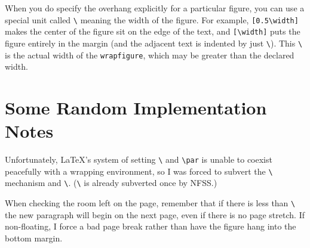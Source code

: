\documentclass[pagesize=auto]{scrartcl}
\makeatletter
\newcommand*{\cs}[1]{\texttt{\textbackslash#1}}
\newcommand*{\cmd}[1]{\cs{\expandafter\@gobble\string#1}}
\newcommand*{\env}[1]{\texttt{#1}}
\makeatother
\begin{document}
When you do specify the overhang explicitly for a particular figure, you
can use a special unit called \cmd{\width} meaning the width of the figure.
For example, \verb+[0.5\width]+ makes the center of the figure sit on the
edge of the text, and \verb+[\width]+ puts the figure entirely in the margin
(and the adjacent text is indented by just \cmd{\columnsep}).  This \cmd{\width}
is the actual width of the \env{wrapfigure}, which may be greater than the 
declared width.


\section{Some Random Implementation Notes}

Unfortunately, \LaTeX's system of setting \cmd{\everypar} and \cs{par} is
unable to coexist peacefully with a wrapping environment, so I was
forced to subvert the \cmd{\@setpar} mechanism and \cmd{\everypar}.  (\cmd{\everypar}
is already subverted once by NFSS.)

When checking the room left on the page, remember that if there is less
than \cmd{\baselineskip} the new paragraph will begin on the next page, even
if there is no page stretch. If non-floating, I force a bad page break
rather than have the figure hang into the bottom margin.
\end{document}
